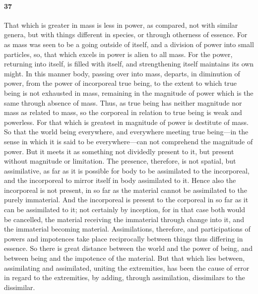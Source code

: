 \documentclass[12pt]{article}
\begin{document}
\paragraph{37} That which is greater in mass is less in power, as compared, not
with similar genera, but with things different in species, or through otherness
of es\-sence. For as mass was seen to be a going outside of itself, and a
division of power into small particles, so, that which excels in power is alien
to all mass. For the power, returning into itself, is filled with itself, and
strengthening itself maintains its own might. In this manner body, passing over
into mass, departs, in diminution of power, from the power of incorporeal true
being, to the extent to which true being is not exhausted in mass, remaining in
the magnitude of power which is the same through absence of mass. Thus, as true
being has neither magnitude nor mass as related to mass, so the corporeal in
relation to true being is weak and powerless. For that which is greatest in
magnitude of power is destitute of mass. So that the world being everywhere,
and everywhere meeting true being---in the sense in which it is said to be
everywhere---can not comprehend the magnitude of power. But it meets it as
something not dividedly present to it, but present without magnitude or
limitation. The presence, therefore, is not spatial, but assimilative, as far
as it is possible for body to be assimilated to the incorporeal, and the
incorporeal to mirror itself in body assimilated to it. Hence also the
incorporeal is not present, in so far as the material cannot be assimilated to
the purely immaterial. And the incorporeal is present to the corporeal in so
far as it can be assimilated to it; not certainly by inception, for in that
case both would be cancelled, the material receiving the immaterial through
change into it, and the immaterial becoming material. Assimilations, therefore,
and participations of powers and impotences take place reciprocally between
things thus differing in es\-sence. So there is great distance between the
world and the power of being, and between being and the impotence of the
material. But that which lies between, assimilating and assimilated, uniting
the extremities, has been the cause of error in regard to the extremities, by
adding, through assimilation, dissimilars to the dissimilar.
\end{document}
